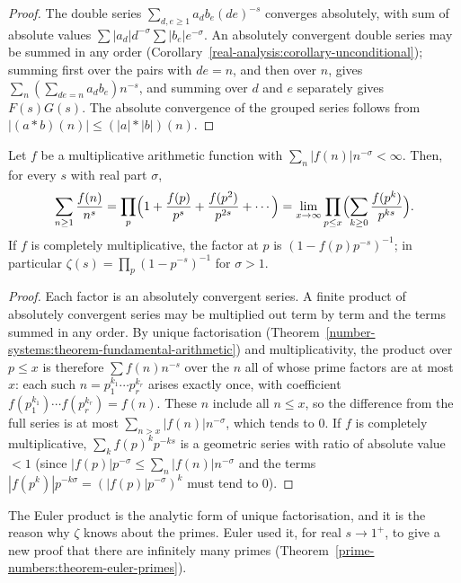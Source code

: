 \begin{proof}
The double series $\sum_{d, e \geq 1}a_db_e(de)^{-s}$ converges absolutely, with sum of absolute values $\sum|a_d|d^{-\sigma}\sum|b_e|e^{-\sigma}$. An absolutely convergent double series may be summed in
any order (Corollary~\ref{real-analysis:corollary-unconditional}); summing first over the pairs with $de = n$, and then over $n$, gives $\sum_n(\sum_{de = n}a_db_e)n^{-s}$, and summing over $d$ and $e$
separately gives $F(s)G(s)$. The absolute convergence of the grouped series follows from $|(a * b)(n)| \leq (|a| * |b|)(n)$.
\end{proof}

\begin{theorem}\label{analytic-number-theory:theorem-euler-product}
Let $f$ be a multiplicative arithmetic function with $\sum_n|f(n)|n^{-\sigma} < \infty$. Then, for every $s$ with real part $\sigma$,
\[
\sum_{n \geq 1}\frac{f(n)}{n^s} = \prod_p\Bigl(1 + \frac{f(p)}{p^s} + \frac{f(p^2)}{p^{2s}} + \cdots\Bigr) = \lim_{x \to \infty}\prod_{p \leq x}\Bigl(\sum_{k \geq 0}\frac{f(p^k)}{p^{ks}}\Bigr).
\]
If $f$ is completely multiplicative, the factor at $p$ is $(1 - f(p)p^{-s})^{-1}$; in particular $\zeta(s) = \prod_p(1 - p^{-s})^{-1}$ for $\sigma > 1$.
\end{theorem}

\begin{proof}
Each factor is an absolutely convergent series. A finite product of absolutely convergent series may be multiplied out term by term and the terms summed in any order. By unique factorisation
(Theorem~\ref{number-systems:theorem-fundamental-arithmetic}) and multiplicativity, the product over $p \leq x$ is therefore $\sum f(n)n^{-s}$ over the $n$ all of whose prime factors are at most $x$:
each such $n = p_1^{k_1}\cdots p_r^{k_r}$ arises exactly once, with coefficient $f(p_1^{k_1})\cdots f(p_r^{k_r}) = f(n)$. These $n$ include all $n \leq x$, so the difference from the full series is at
most $\sum_{n > x}|f(n)|n^{-\sigma}$, which tends to $0$. If $f$ is completely multiplicative, $\sum_kf(p)^kp^{-ks}$ is a geometric series with ratio of absolute value $< 1$ (since
$|f(p)|p^{-\sigma} \leq \sum_n|f(n)|n^{-\sigma}$ and the terms $|f(p^k)|p^{-k\sigma} = (|f(p)|p^{-\sigma})^k$ must tend to $0$).
\end{proof}

The Euler product is the analytic form of unique factorisation, and it is the reason why $\zeta$ knows about the primes. Euler used it, for real $s \to 1^+$, to give a new proof that there are
infinitely many primes (Theorem~\ref{prime-numbers:theorem-euler-primes}).

